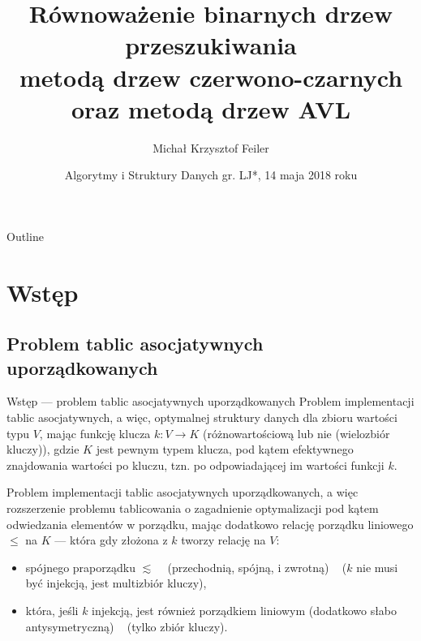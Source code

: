 \documentclass{beamer}
\title[Metody drzew czerwono-czarnych oraz drzew AVL]{Równoważenie binarnych drzew przeszukiwania \\ metodą drzew czerwono-czarnych\\ oraz metodą drzew AVL}
\author[Michał K. Feiler]{Michał Krzysztof Feiler}
\date{Algorytmy i Struktury Danych gr. LJ*, 14 maja 2018 roku}
\begin{document}
\begin{frame}
  \titlepage
\end{frame}

\begin{frame}{Outline}
  \tableofcontents
\end{frame}

\section{Wstęp}

\subsection{Problem tablic asocjatywnych uporządkowanych}

\begin{frame}{Wstęp --- problem tablic asocjatywnych uporządkowanych}
	Problem implementacji tablic asocjatywnych, a więc, optymalnej struktury danych dla
    zbioru wartości typu $V$, mając funkcję klucza
    $k : V \rightarrow K$ (różnowartościową lub nie (wielozbiór kluczy)), 
    gdzie $K$ jest pewnym typem klucza, pod kątem
    efektywnego znajdowania wartości po kluczu, 
    tzn. po odpowiadającej im wartości funkcji $k$.
    
    \vspace{0.25cm}
    
    Problem implementacji tablic asocjatywnych uporządkowanych, a więc rozszerzenie
    problemu tablicowania o zagadnienie optymalizacji pod kątem odwiedzania
    elementów w porządku, mając dodatkowo relację porządku liniowego $\leq$ na $K$ —
    która gdy złożona z $k$ tworzy relację na $V$:
    \begin{itemize}
    \item spójnego praporządku $\lesssim$ ~ 
    (przechodnią, spójną, i zwrotną) ~ 
    ($k$ nie musi być injekcją, jest multizbiór kluczy),
    \item która, jeśli $k$ injekcją, jest również porządkiem liniowym 
    (dodatkowo słabo antysymetryczną) ~ (tylko zbiór kluczy).
    \end{itemize}
\end{frame}
\end{document}
